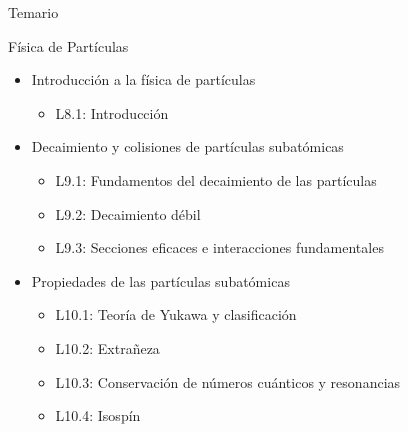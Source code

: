 \documentclass{beamer}
\begin{document}
\begin{frame}{Temario}
    \begin{Large}Física de Partículas\end{Large}
    \begin{itemize}
        \item Introducción a la física de partículas
\begin{itemize}
        \item L8.1: Introducción
\end{itemize}        
        \item Decaimiento y colisiones de partículas subatómicas
\begin{itemize}
        \item L9.1: Fundamentos del decaimiento de las partículas
        \item L9.2: Decaimiento débil
        \item L9.3: Secciones eficaces e interacciones fundamentales
\end{itemize} 
        \item Propiedades de las partículas subatómicas
\begin{itemize}
        \item L10.1: Teoría de Yukawa y clasificación
        \item L10.2: Extrañeza
        \item L10.3: Conservación de números cuánticos y resonancias
        \item L10.4: Isospín
\end{itemize}      
    \end{itemize}
\end{frame}
\end{document}
